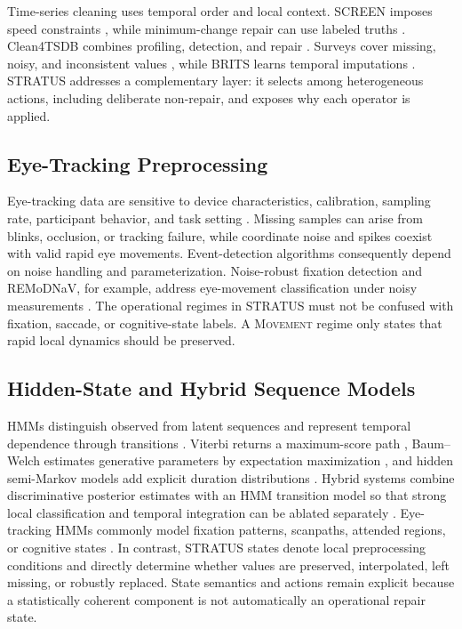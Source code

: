 \documentclass[sigconf,review]{acmart}
\newcommand{\STRATUS}{\textsc{STRATUS}\xspace}
\begin{document}
Time-series cleaning uses temporal order and local context. SCREEN imposes speed constraints \cite{song2015screen}, while minimum-change repair can use labeled truths \cite{zhang2017timeseries}. Clean4TSDB combines profiling, detection, and repair \cite{ding2024clean4tsdb}. Surveys cover missing, noisy, and inconsistent values \cite{wang2020survey}, while BRITS learns temporal imputations \cite{cao2018brits}. \STRATUS addresses a complementary layer: it selects among heterogeneous actions, including deliberate non-repair, and exposes why each operator is applied.

\subsection{Eye-Tracking Preprocessing}

Eye-tracking data are sensitive to device characteristics, calibration, sampling rate, participant behavior, and task setting \cite{holmqvist2011eye}. Missing samples can arise from blinks, occlusion, or tracking failure, while coordinate noise and spikes coexist with valid rapid eye movements. Event-detection algorithms consequently depend on noise handling and parameterization. Noise-robust fixation detection and REMoDNaV, for example, address eye-movement classification under noisy measurements \cite{hessels2017noise,dar2021remodnav}. The operational regimes in \STRATUS must not be confused with fixation, saccade, or cognitive-state labels. A \textsc{Movement} regime only states that rapid local dynamics should be preserved.

\subsection{Hidden-State and Hybrid Sequence Models}

HMMs distinguish observed from latent sequences and represent temporal dependence through transitions \cite{rabiner1989tutorial}. Viterbi returns a maximum-score path \cite{viterbi1967error}, Baum--Welch estimates generative parameters by expectation maximization \cite{baum1970maximization,dempster1977em}, and hidden semi-Markov models add explicit duration distributions \cite{yu2010hidden}. Hybrid systems combine discriminative posterior estimates with an HMM transition model so that strong local classification and temporal integration can be ablated separately \cite{smyth1992fault,rigoll1996hybrid}. Eye-tracking HMMs commonly model fixation patterns, scanpaths, attended regions, or cognitive states \cite{chuk2014understanding,hsiao2021emhmm,pierdicca2018hmm,kim2020moving}. In contrast, \STRATUS states denote local preprocessing conditions and directly determine whether values are preserved, interpolated, left missing, or robustly replaced. State semantics and actions remain explicit because a statistically coherent component is not automatically an operational repair state.
\end{document}
